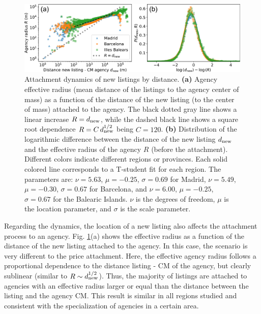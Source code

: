 \begin{figure}
    \centering
    \includegraphics[width =\textwidth]{Figs/Idealista_dynamics/distance_attach.pdf}
	\caption[Attachment dynamics of new listings by distance.]{ Attachment dynamics of new listings by distance. \textbf{(a)} Agency effective radius (mean distance of the listings to the agency center of mass) as a function of the distance of the new listing (to the center of mass) attached to the agency. The black dotted gray line shows a linear increase $R = d_{\rm new}$, while the dashed black line shows a square root dependence $R = C \, d_{\rm new}^{1/2}$ being $C = 120$. \textbf{(b)} Distribution of the logarithmic difference between the distance of the new listing $d_{\rm new}$ and the effective radius of the agency $R$ (before the attachment). Different colors indicate different regions or provinces. Each solid colored line corresponds to a T-student fit for each region.  The parameters are: $\nu = 5.63$, $\mu = -0.25$, $\sigma = 0.69$ for Madrid, $\nu = 5.49$, $\mu = -0.30$, $\sigma = 0.67$ for Barcelona, and $\nu = 6.00$, $\mu = -0.25$, $\sigma = 0.67$ for the Balearic Islands. $\nu$ is the degrees of freedom, $\mu$ is the location parameter, and $\sigma$ is the scale parameter. \label{fig:distance_attach}}
\end{figure}

Regarding the dynamics, the location of a new listing also affects the attachment process to an agency. Fig. \ref{fig:distance_attach}(a) shows the effective radius as a function of the distance of the new listing attached to the agency. In this case, the scenario is very different to the price attachment. Here, the effective agency radius follows a proportional dependence to the distance listing - CM of the agency, but clearly sublinear (similar to $R \sim d_{\rm new}^{1/2}$). Thus, the majority of listings are attached to agencies with an effective radius larger or equal than the distance between the listing and the agency CM. This result is similar in all regions studied and consistent with the specialization of agencies in a certain area.

